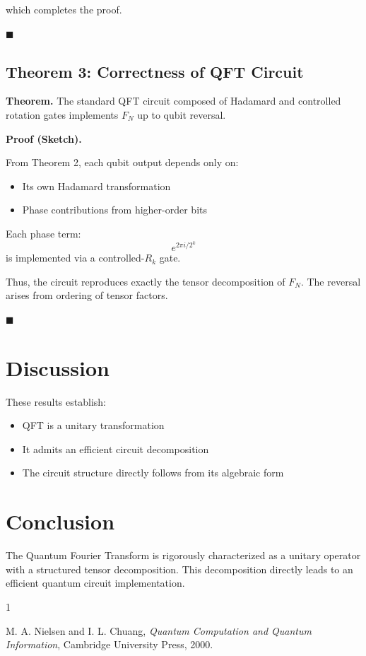\documentclass[conference]{article}
\begin{document}
which completes the proof.

\hfill $\blacksquare$

\subsection{Theorem 3: Correctness of QFT Circuit}

\textbf{Theorem.}
The standard QFT circuit composed of Hadamard and controlled rotation gates implements $F_N$ up to qubit reversal.

\textbf{Proof (Sketch).}

From Theorem 2, each qubit output depends only on:
\begin{itemize}
    \item Its own Hadamard transformation
    \item Phase contributions from higher-order bits
\end{itemize}

Each phase term:
\begin{equation}
e^{2\pi i / 2^k}
\end{equation}
is implemented via a controlled-$R_k$ gate.

Thus, the circuit reproduces exactly the tensor decomposition of $F_N$. The reversal arises from ordering of tensor factors.

\hfill $\blacksquare$

\section{Discussion}\label{sec:discussion}

These results establish:
\begin{itemize}
    \item QFT is a unitary transformation
    \item It admits an efficient circuit decomposition
    \item The circuit structure directly follows from its algebraic form
\end{itemize}

\section{Conclusion}\label{sec:conclusion}

The Quantum Fourier Transform is rigorously characterized as a unitary operator with a structured tensor decomposition.
This decomposition directly leads to an efficient quantum circuit implementation.

\begin{thebibliography}{1}

M. A. Nielsen and I. L. Chuang,
\textit{Quantum Computation and Quantum Information},
Cambridge University Press, 2000.

\end{thebibliography}
\end{document}
